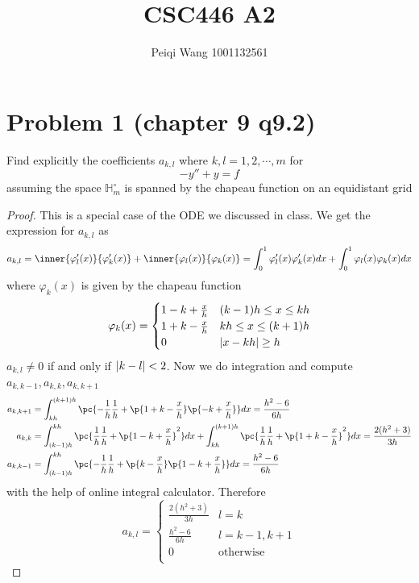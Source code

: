 \documentclass[11pt]{article}
\title{CSC446 A2}
\author{Peiqi Wang 1001132561}
\begin{document}
\maketitle
    
\section*{Problem 1 (chapter 9 q9.2)}
Find explicitly the coefficients $a_{k,l}$ where $k,l=1,2,\cdots,m$ for 
\[
    -y'' + y = f    
\]
assuming the space $\mathbb{H}^{\circ}_m$ is spanned by the chapeau function on an equidistant grid
\begin{proof}
    This is a special case of the ODE we discussed in class. We get the expression for $a_{k,l}$ as
    \[
        a_{k,l} 
        = \inner{\varphi_l'(x)}{\varphi_k'(x)} + \inner{\varphi_l(x)}{\varphi_k(x)}
        = \int_0^1 \varphi_l'(x) \varphi_k'(x) dx + \int_0^1 \varphi_l(x) \varphi_k(x) dx
    \]
    where $\varphi_k(x)$ is given by the chapeau function 
    \[
        \varphi_k(x) = 
        \begin{cases}
            1 - k + \frac{x}{h} & (k-1)h \leq x \leq kh \\
            1 + k - \frac{x}{h} & kh \leq x \leq (k+1)h \\
            0 & \left|x-kh\right| \geq h
        \end{cases}  
    \]
    $a_{k,l} \neq 0$ if and only if $\left|k-l\right| < 2$. Now we do integration and compute $a_{k,k-1}, a_{k,k}, a_{k,k+1}$ 
    \begin{align*}
        a_{k,k+1} 
        &= \int_{kh}^{(k+1)h} \pc{
            -\frac{1}{h} \frac{1}{h} + 
            \p{1+k-\frac{x}{h}} \p{-k+\frac{x}{h}}
        } dx
        = \frac{h^2-6}{6h} \\
        a_{k,k}
        &= \int_{(k-1)h}^{kh} \pc{
            \frac{1}{h} \frac{1}{h} + 
            \p{1-k+\frac{x}{h}}^2
        } dx
        + \int_{kh}^{(k+1)h} \pc{
            \frac{1}{h} \frac{1}{h} + 
            \p{1+k-\frac{x}{h}}^2
        } dx
        = \frac{2(h^2+3)}{3h} \\
        a_{k,k-1}
        &= \int_{(k-1)h}^{kh} \pc{
            -\frac{1}{h} \frac{1}{h} + 
            \p{k-\frac{x}{h}} \p{1-k+\frac{x}{h}}
        } dx
        = \frac{h^2-6}{6h}
    \end{align*}
    with the help of online integral calculator. Therefore 
    \[
        a_{k,l} = 
        \begin{cases}
            \frac{2(h^2+3)}{3h} & l = k \\
            \frac{h^2-6}{6h} & l = k-1,k+1 \\
            0 & \text{otherwise} \\
        \end{cases} 
    \]
\end{proof}
 
\end{document}
